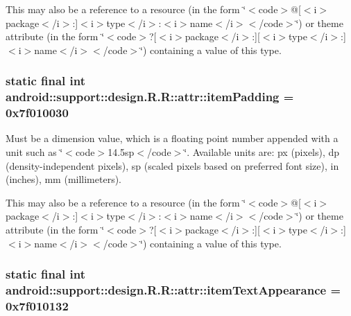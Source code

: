 This may also be a reference to a resource (in the form \char`\"{}$<$code$>$@\mbox{[}$<$i$>$package$<$/i$>$:\mbox{]}$<$i$>$type$<$/i$>$:$<$i$>$name$<$/i$>$$<$/code$>$\char`\"{}) or theme attribute (in the form \char`\"{}$<$code$>$?\mbox{[}$<$i$>$package$<$/i$>$:\mbox{]}\mbox{[}$<$i$>$type$<$/i$>$:\mbox{]}$<$i$>$name$<$/i$>$$<$/code$>$\char`\"{}) containing a value of this type. \hypertarget{classandroid_1_1support_1_1design_1_1_r_1_1attr_8fcb86beaf70ce5aec62b45b36ef498c}{
\subsubsection[{itemPadding}]{\setlength{\rightskip}{0pt plus 5cm}static final int android::support::design.R.R::attr::itemPadding = 0x7f010030}}
\label{classandroid_1_1support_1_1design_1_1_r_1_1attr_8fcb86beaf70ce5aec62b45b36ef498c}


Must be a dimension value, which is a floating point number appended with a unit such as \char`\"{}$<$code$>$14.5sp$<$/code$>$\char`\"{}. Available units are: px (pixels), dp (density-independent pixels), sp (scaled pixels based on preferred font size), in (inches), mm (millimeters). 

This may also be a reference to a resource (in the form \char`\"{}$<$code$>$@\mbox{[}$<$i$>$package$<$/i$>$:\mbox{]}$<$i$>$type$<$/i$>$:$<$i$>$name$<$/i$>$$<$/code$>$\char`\"{}) or theme attribute (in the form \char`\"{}$<$code$>$?\mbox{[}$<$i$>$package$<$/i$>$:\mbox{]}\mbox{[}$<$i$>$type$<$/i$>$:\mbox{]}$<$i$>$name$<$/i$>$$<$/code$>$\char`\"{}) containing a value of this type. \hypertarget{classandroid_1_1support_1_1design_1_1_r_1_1attr_a7ae4006627460038142667fd70dedc4}{
\subsubsection[{itemTextAppearance}]{\setlength{\rightskip}{0pt plus 5cm}static final int android::support::design.R.R::attr::itemTextAppearance = 0x7f010132}}
\label{classandroid_1_1support_1_1design_1_1_r_1_1attr_a7ae4006627460038142667fd70dedc4}


